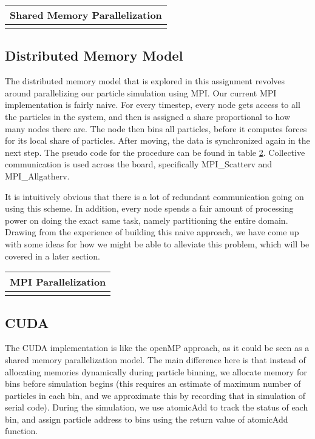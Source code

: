 \documentclass[11pt]{article}
\begin{document}
\begin{table}[htb]
  \centering
  \begin{tabular}{l}
    \hline
      Shared Memory Parallelization\\
    \hline
      \\
    \hline
  \end{tabular}
  \label{tab:shared_memory}
\end{table}

\FloatBarrier

\subsection{Distributed Memory Model}
The distributed memory model that is explored in this assignment revolves around parallelizing our particle simulation using MPI. Our current MPI implementation is fairly naive. For every timestep, every node gets access to all the particles in the system, and then is assigned a share proportional to how many nodes there are. The node then bins all particles, before it computes forces for its local share of particles. After moving, the data is synchronized again in the next step. The pseudo code for the procedure can be found in table \ref{tab:mpi_naive}. Collective communication is used across the board, specifically MPI\_Scatterv and MPI\_Allgatherv.

It is intuitively obvious that there is a lot of redundant communication going on using this scheme. In addition, every node spends a fair amount of processing power on doing the exact same task, namely partitioning the entire domain. Drawing from the experience of building this naive approach, we have come up with some ideas for how we might be able to alleviate this problem, which will be covered in a later section.

\begin{table}[htb]
  \centering
  \begin{tabular}{l}
    \hline
      MPI Parallelization\\
    \hline
      \\
    \hline
  \end{tabular}
  \label{tab:mpi_naive}
\end{table}

\subsection{CUDA}
The CUDA implementation is like the openMP approach, as it could be seen as a shared memory parallelization model.
The main difference here is that instead of allocating memories dynamically during particle binning, we allocate
memory for bins before simulation begins (this requires an estimate of maximum number of particles in each bin, and
we approximate this by recording that in simulation of serial code). During the simulation, we use atomicAdd to 
track the status of each bin, and assign particle address to bins using the return value of atomicAdd function.
\end{document}
